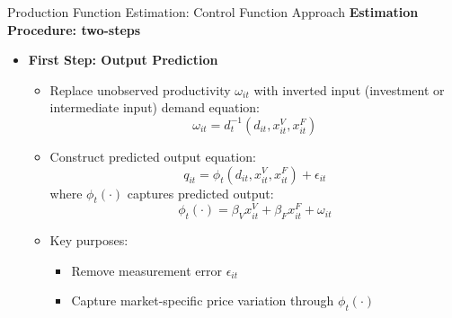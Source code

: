 \documentclass[aspectratio=169]{beamer}  %
\begin{document}
\begin{frame}{Production Function Estimation: Control Function Approach}
\textbf{Estimation Procedure: two-steps}
    \begin{itemize}
        \item \textbf{First Step: Output Prediction}
        \begin{itemize}
            \item Replace unobserved productivity $\omega_{it}$ with inverted input (investment or intermediate input) demand equation:
            \[
                \omega_{it} = d_t^{-1}(d_{it}, x_{it}^V, x_{it}^F)
            \]
            
            \item Construct predicted output equation:
            \[
                q_{it} = \phi_t(d_{it}, x_{it}^V, x_{it}^F) + \epsilon_{it}
            \]
            where $\phi_t(\cdot)$ captures predicted output:
            \[
                \phi_t(\cdot) = \beta_V x_{it}^V + \beta_F x_{it}^F + \omega_{it}
            \]
            
            \item Key purposes:
            \begin{itemize}
                \item Remove measurement error $\epsilon_{it}$
                \item Capture market-specific price variation through $\phi_t(\cdot)$
            \end{itemize}
        \end{itemize}
    \end{itemize}
\end{frame}
\end{document}
